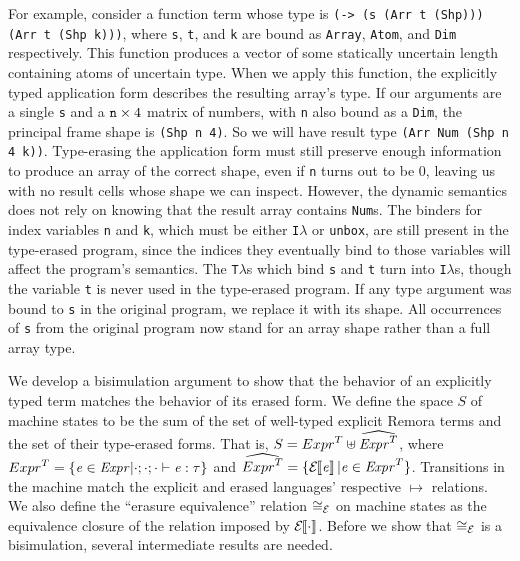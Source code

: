 For example, consider a function term whose type is
{\tt (-> (s (Arr t (Shp))) (Arr t (Shp k)))},
where {\tt s}, {\tt t}, and {\tt k} are
bound as {\tt Array}, {\tt Atom}, and {\tt Dim} respectively.
This function produces a vector of some statically uncertain length
containing atoms of uncertain type.
When we apply this function,
the explicitly typed application form
describes the resulting array's type.
If our arguments are a single {\tt s}
and a ${\tt n} \times 4$ matrix of numbers,
with {\tt n} also bound as a {\tt Dim},
the principal frame shape is {\tt (Shp n 4)}.
So we will have result type {\tt (Arr Num (Shp n 4 k))}.
Type-erasing the application form must still preserve
enough information to produce an array of the correct shape,
even if {\tt n} turns out to be 0,
leaving us with no result cells whose shape we can inspect.
However, the dynamic semantics does not rely on knowing that
the result array contains {\tt Num}s.
The binders for index variables {\tt n} and {\tt k},
which must be either {\tt I$\lambda$} or {\tt unbox},
are still present in the type-erased program,
since the indices they eventually bind to those variables
will affect the program's semantics.
The {\tt T$\lambda$}s which bind {\tt s} and {\tt t}
turn into {\tt I$\lambda$}s,
though the variable {\tt t} is never used in the type-erased program.
If any type argument was bound to {\tt s} in the original program,
we replace it with its shape.
All occurrences of {\tt s} from the original program
now stand for an array shape rather than a full array type.

We develop a bisimulation argument to show that
the behavior of an explicitly typed term matches the behavior of its erased form.
We define the space $S$ of machine states to be the sum of
the set of well-typed explicit Remora terms
and the set of their type-erased forms.
That is, $S = {Expr}^{T} \uplus \widehat{{\mathit{Expr}}^{T}}$,
where
${Expr}^{T} =
\{\mathit{e} \in \mathit{Expr} | \cdot;\cdot;\cdot \vdash \mathit{e} : \mathit{\tau}\}$
and
$\widehat{{Expr}^{T}} =
\{\mathcal{E}{\hskip-.25em}\left\llbracket \mathit{e} \right\rrbracket | \mathit{e} \in {\mathit{Expr}}^{T}\}$.
Transitions in the machine match the explicit and erased languages' respective $\mapsto$ relations.
We also define the ``erasure equivalence'' relation $\cong_{\mathcal{E}}$ on machine states as
the equivalence closure of the relation imposed by $\mathcal{E}{\hskip-.25em}\left\llbracket \cdot \right\rrbracket$.
Before we show that $\cong_{\mathcal{E}}$ is a bisimulation, several intermediate results are needed.

